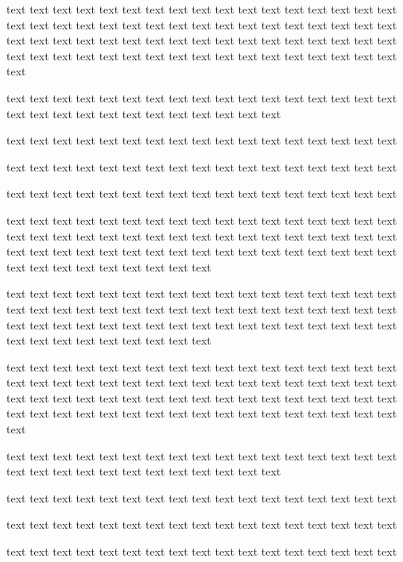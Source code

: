 \documentclass{article}
\begin{document}
    text text text text text text text text text text text text text text text text text text text text text text text text text text text text text text text text text text text text text text text text text text text text text text text text text text text text text text text text text text text text text text text text text text text text text

    text text text text text text text text text text text text text text text text text text text text text text text text text text text text text

    text text text text text text text text text text text text text text text text text

    text text text text text text text text text text text text text text text text text

    text text text text text text text text text text text text text text text text text

text text text text text text text text text text text text text text text text text text text text text text text text text text text text text text text text text text text text text text text text text text text text text text text text text text text text text text text text text text text text

    text text text text text text text text text text text text text text text text text text text text text text text text text text text text text text text text text text text text text text text text text text text text text text text text text text text text text text text text text text text text

    text text text text text text text text text text text text text text text text text text text text text text text text text text text text text text text text text text text text text text text text text text text text text text text text text text text text text text text text text text text text text text text text text text text text text

    text text text text text text text text text text text text text text text text text text text text text text text text text text text text text

    text text text text text text text text text text text text text text text text text

    text text text text text text text text text text text text text text text text text

    text text text text text text text text text text text text text text text text text
\end{document}
